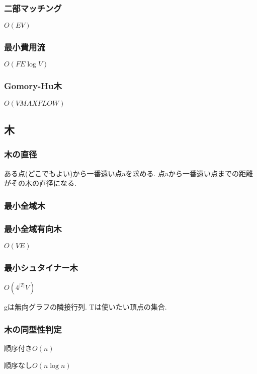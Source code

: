 \subsubsection{二部マッチング}
$O(EV)$\par


\subsubsection{最小費用流}
$O(FE\log V)$\par


\subsubsection{Gomory-Hu木}
$O(V MAXFLOW)$


\subsection{木}
\subsubsection{木の直径}
ある点(どこでもよい)から一番遠い点aを求める. 点aから一番遠い点までの距離がその木の直径になる.\par
\subsubsection{最小全域木}

\subsubsection{最小全域有向木}
$O(VE)$

\subsubsection{最小シュタイナー木}
$O(4^{|T|}V)$ \par
gは無向グラフの隣接行列. Tは使いたい頂点の集合.\par

\subsubsection{木の同型性判定}
順序付き$O(n)$\par
順序なし$O(n\log n)$


